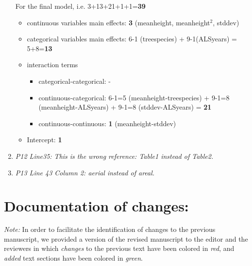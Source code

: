 \documentclass{article}
\begin{document}
\begin{enumerate}
{   For the final model, i.e. 3+13+21+1+1=\textbf{39}
     \begin{itemize}
	\item continuous variables main effects: \textbf{3} (meanheight, meanheight$^2$, stddev)
	\item categorical variables main effects: 6-1 (treespecies) + 9-1(ALSyears) = 5+8=\textbf{13}
	\item interaction terms
	\begin{itemize}
		\item categorical-categorical: -
		\item continuous-categorical: 6-1=5 (meanheight-treespecies) + 9-1=8 (meanheight-ALSyears) + 9-1=8 (stddev-ALSyears) = \textbf{21}
		\item continuous-continuous: \textbf{1} (meanheight-stddev)
	\end{itemize}
	\item Intercept: \textbf{1}
      \end{itemize}
  }
	
	\item \textit{P12 Line35: This is the wrong reference: Table1 instead of Table2.}

	
	\item \textit{P13 Line 43 Column 2: aerial instead of areal.}

	
\end{enumerate}
\newpage

\section*{Documentation of changes:}

\textit{Note:} 
In order to facilitate the identification of changes to the previous manuscript, we provided a version of the revised manuscript to the editor and the reviewers in which \textit{changes} to the previous text have been colored in \textit{red}, and \textit{added} text sections have been colored in \textit{green}.\\
\end{document}

